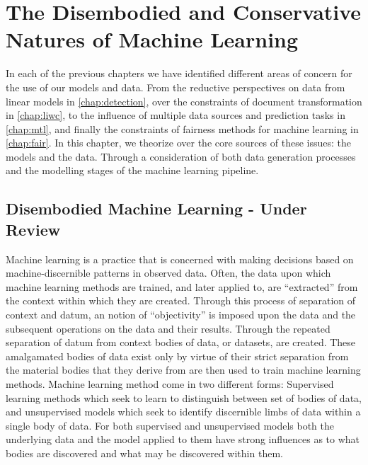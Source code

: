 \ifpdf
    \graphicspath{{Chapter8/Figs/Raster/}{Chapter8/Figs/PDF/}{Chapter8/Figs/}}
\else
    \graphicspath{{Chapter8/Figs/Vector/}{Chapter8/Figs/}}
\fi


\chapter{The Disembodied and Conservative Natures of Machine Learning}\label{chap:haraway-foucault}

In each of the previous chapters we have identified different areas of concern for the use of our models and data. From the reductive perspectives on data from linear models in \autoref{chap:detection}, over the constraints of document transformation in \autoref{chap:liwc}, to the influence of multiple data sources and prediction tasks in \autoref{chap:mtl}, and finally the constraints of fairness methods for machine learning in \autoref{chap:fair}. In this chapter, we theorize over the core sources of these issues: the models and the data. Through a consideration of both data generation processes and the modelling stages of the machine learning pipeline.

\section{Disembodied Machine Learning - Under Review}\label{sec:disembodied}

Machine learning is a practice that is concerned with making decisions based on machine-discernible patterns in observed data. Often, the data upon which machine learning methods are trained, and later applied to, are ``extracted'' from the context within which they are created. Through this process of separation of context and datum, an notion of ``objectivity'' is imposed upon the data and the subsequent operations on the data and their results. Through the repeated separation of datum from context bodies of data, or datasets, are created. These amalgamated bodies of data exist only by virtue of their strict separation from the material bodies that they derive from are then used to train machine learning methods. Machine learning method come in two different forms: Supervised learning methods which seek to learn to distinguish between set of bodies of data, and unsupervised models which seek to identify discernible limbs of data within a single body of data. For both supervised and unsupervised models both the underlying data and the model applied to them have strong influences as to what bodies are discovered and what may be discovered within them.

